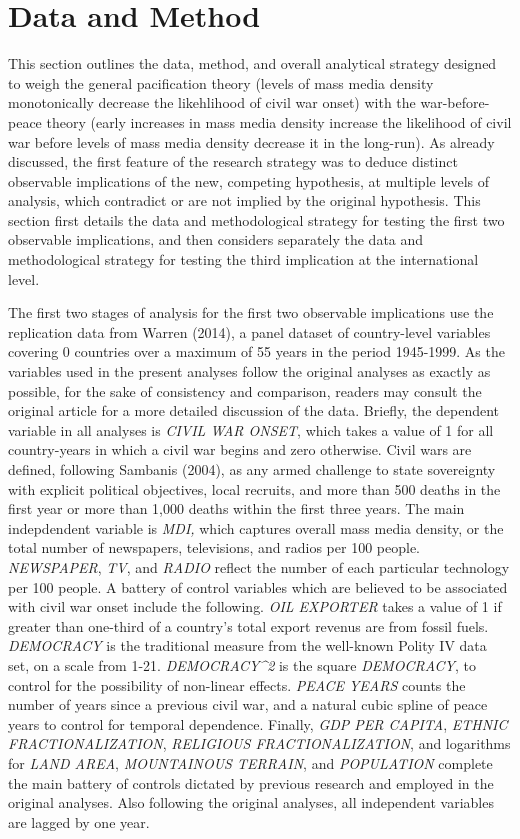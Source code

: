 \documentclass[11pt,article,oneside]{memoir}
\begin{document}
\section{Data and Method}\label{data-and-method}

This section outlines the data, method, and overall analytical strategy
designed to weigh the general pacification theory (levels of mass media
density monotonically decrease the likehlihood of civil war onset) with
the war-before-peace theory (early increases in mass media density
increase the likelihood of civil war before levels of mass media density
decrease it in the long-run). As already discussed, the first feature of
the research strategy was to deduce distinct observable implications of
the new, competing hypothesis, at multiple levels of analysis, which
contradict or are not implied by the original hypothesis. This section
first details the data and methodological strategy for testing the first
two observable implications, and then considers separately the data and
methodological strategy for testing the third implication at the
international level.

The first two stages of analysis for the first two observable
implications use the replication data from Warren (2014), a panel
dataset of country-level variables covering 0 countries over a maximum
of 55 years in the period 1945-1999. As the variables used in the
present analyses follow the original analyses as exactly as possible,
for the sake of consistency and comparison, readers may consult the
original article for a more detailed discussion of the data. Briefly,
the dependent variable in all analyses is \emph{CIVIL WAR ONSET}, which
takes a value of 1 for all country-years in which a civil war begins and
zero otherwise. Civil wars are defined, following Sambanis (2004), as
any armed challenge to state sovereignty with explicit political
objectives, local recruits, and more than 500 deaths in the first year
or more than 1,000 deaths within the first three years. The main
indepdendent variable is \emph{MDI,} which captures overall mass media
density, or the total number of newspapers, televisions, and radios per
100 people. \emph{NEWSPAPER}, \emph{TV}, and \emph{RADIO} reflect the
number of each particular technology per 100 people. A battery of
control variables which are believed to be associated with civil war
onset include the following. \emph{OIL EXPORTER} takes a value of 1 if
greater than one-third of a country's total export revenus are from
fossil fuels. \emph{DEMOCRACY} is the traditional measure from the
well-known Polity IV data set, on a scale from 1-21.
\emph{DEMOCRACY\^{}2} is the square \emph{DEMOCRACY}, to control for the
possibility of non-linear effects. \emph{PEACE YEARS} counts the number
of years since a previous civil war, and a natural cubic spline of peace
years to control for temporal dependence. Finally, \emph{GDP PER
CAPITA}, \emph{ETHNIC FRACTIONALIZATION}, \emph{RELIGIOUS
FRACTIONALIZATION}, and logarithms for \emph{LAND AREA},
\emph{MOUNTAINOUS TERRAIN}, and \emph{POPULATION} complete the main
battery of controls dictated by previous research and employed in the
original analyses. Also following the original analyses, all independent
variables are lagged by one year.
\end{document}
